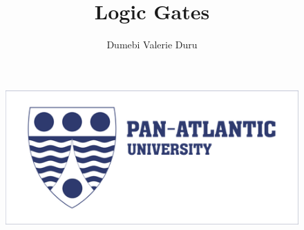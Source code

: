 \documentclass{article}
\begin{document}
	\begin{titlepage}
			\title{\huge{Logic Gates}}
		\author{Dumebi Valerie Duru}
		\maketitle
		\begin{figure}[t!]
			\centering
			\includegraphics[width=0.9\linewidth]{pictures/pau logo.png}
		\end{figure}
	\end{titlepage}
	
	
		
		\tableofcontents
		
		\newpage
\end{document}
